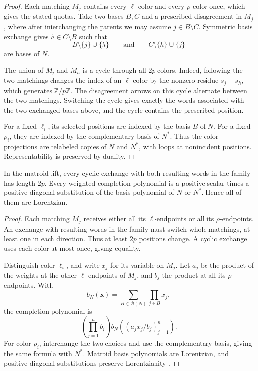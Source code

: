 \begin{proof}
Each matching $M_j$ contains every $\ell$-color and every $\rho$-color once,
which gives the stated quotas. Take two bases $B,C$ and a prescribed
disagreement in $M_j$, where after interchanging the parents we may assume
$j\in B\setminus C$. Symmetric basis exchange gives
$h\in C\setminus B$ such that
\[
 B\setminus\{j\}\cup\{h\}
 \qquad\text{and}\qquad
 C\setminus\{h\}\cup\{j\}
\]
are bases of $N$.

The union of $M_j$ and $M_h$ is a cycle through all $2p$ colors. Indeed,
following the two matchings changes the index of an $\ell$-color by the
nonzero residue $s_j-s_h$, which generates $\mathbb Z/p\mathbb Z$. The
disagreement arrows on this cycle alternate between the two matchings.
Switching the cycle gives exactly the words associated with the two exchanged
bases above, and the cycle contains the prescribed position.

For a fixed $\ell_i$, its selected positions are indexed by the basis $B$ of
$N$. For a fixed $\rho_i$, they are indexed by the complementary basis of
$N^*$. Thus the color projections are relabeled copies of $N$ and $N^*$,
with loops at nonincident positions. Representability is preserved by duality.
\end{proof}

\begin{corollary}
In the matroid lift, every cyclic exchange with both resulting words
in the family has length $2p$. Every weighted completion polynomial is
a positive scalar times a positive diagonal substitution of the basis polynomial
of $N$ or $N^*$. Hence all of them are Lorentzian.
\end{corollary}

\begin{proof}
Each matching $M_j$ receives either all its $\ell$-endpoints or all its
$\rho$-endpoints. An exchange with resulting words in the family must
switch whole matchings, at least one in each direction. Thus at least
$2p$ positions change. A cyclic exchange uses each color at most once,
giving equality.

Distinguish color $\ell_i$, and write $x_j$ for its variable on $M_j$.
Let $a_j$ be the product of the weights at the other $\ell$-endpoints
of $M_j$, and $b_j$ the product at all its $\rho$-endpoints. With
\[
 b_N(\mathbf x)=\sum_{B\in\mathcal B(N)}\prod_{j\in B}x_j,
\]
the completion polynomial is
\[
 \left(\prod_{j=1}^n b_j\right)
 b_N((a_jx_j/b_j)_{j=1}^n).
\]
For color $\rho_i$, interchange the two choices and use the
complementary basis, giving the same formula with $N^*$.
Matroid basis polynomials are Lorentzian, and positive diagonal
substitutions preserve Lorentzianity
\cite[Theorems~2.10 and 3.10]{BrandenHuh2020}.
\end{proof}

